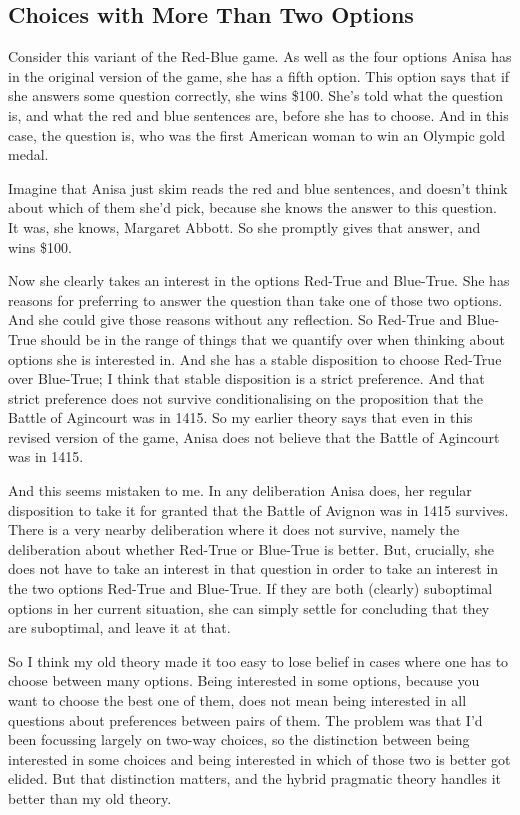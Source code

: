 \documentclass[
  12pt,
  letterpaper,
]{scrbook}
\begin{document}
\subsection{Choices with More Than Two Options}\label{sec-threeway}

Consider this variant of the Red-Blue game. As well as the four options
Anisa has in the original version of the game, she has a fifth option.
This option says that if she answers some question correctly, she wins
\$100. She's told what the question is, and what the red and blue
sentences are, before she has to choose. And in this case, the question
is, who was the first American woman to win an Olympic gold medal.

Imagine that Anisa just skim reads the red and blue sentences, and
doesn't think about which of them she'd pick, because she knows the
answer to this question. It was, she knows, Margaret Abbott. So she
promptly gives that answer, and wins \$100.

Now she clearly takes an interest in the options Red-True and Blue-True.
She has reasons for preferring to answer the question than take one of
those two options. And she could give those reasons without any
reflection. So Red-True and Blue-True should be in the range of things
that we quantify over when thinking about options she is interested in.
And she has a stable disposition to choose Red-True over Blue-True; I
think that stable disposition is a strict preference. And that strict
preference does not survive conditionalising on the proposition that the
Battle of Agincourt was in 1415. So my earlier theory says that even in
this revised version of the game, Anisa does not believe that the Battle
of Agincourt was in 1415.

And this seems mistaken to me. In any deliberation Anisa does, her
regular disposition to take it for granted that the Battle of Avignon
was in 1415 survives. There is a very nearby deliberation where it does
not survive, namely the deliberation about whether Red-True or Blue-True
is better. But, crucially, she does not have to take an interest in that
question in order to take an interest in the two options Red-True and
Blue-True. If they are both (clearly) suboptimal options in her current
situation, she can simply settle for concluding that they are
suboptimal, and leave it at that.

So I think my old theory made it too easy to lose belief in cases where
one has to choose between many options. Being interested in some
options, because you want to choose the best one of them, does not mean
being interested in all questions about preferences between pairs of
them. The problem was that I'd been focussing largely on two-way
choices, so the distinction between being interested in some choices and
being interested in which of those two is better got elided. But that
distinction matters, and the hybrid pragmatic theory handles it better
than my old theory.
\end{document}
